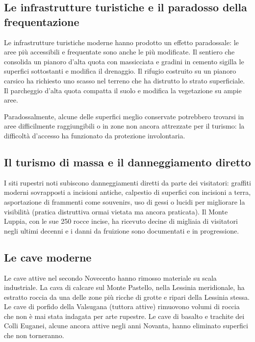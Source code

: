 \subsection{Le infrastrutture turistiche e il paradosso della frequentazione}

Le infrastrutture turistiche moderne hanno prodotto un effetto paradossale: le aree più accessibili e frequentate sono anche le più modificate. Il sentiero che consolida un pianoro d'alta quota con massicciata e gradini in cemento sigilla le superfici sottostanti e modifica il drenaggio. Il rifugio costruito su un pianoro carsico ha richiesto uno scasso nel terreno che ha distrutto lo strato superficiale. Il parcheggio d'alta quota compatta il suolo e modifica la vegetazione su ampie aree.

Paradossalmente, alcune delle superfici meglio conservate potrebbero trovarsi in aree difficilmente raggiungibili o in zone non ancora attrezzate per il turismo: la difficoltà d'accesso ha funzionato da protezione involontaria.

\subsection{Il turismo di massa e il danneggiamento diretto}

I siti rupestri noti subiscono danneggiamenti diretti da parte dei visitatori: graffiti moderni sovrapposti a incisioni antiche, calpestio di superfici con incisioni a terra, asportazione di frammenti come souvenirs, uso di gessi o lucidi per migliorare la visibilità (pratica distruttiva ormai vietata ma ancora praticata). Il Monte Luppia, con le sue 250 rocce incise, ha ricevuto decine di migliaia di visitatori negli ultimi decenni e i danni da fruizione sono documentati e in progressione.

\subsection{Le cave moderne}

Le cave attive nel secondo Novecento hanno rimosso materiale su scala industriale. La cava di calcare sul Monte Pastello, nella Lessinia meridionale, ha estratto roccia da una delle zone più ricche di grotte e ripari della Lessinia stessa. Le cave di porfido della Valsugana (tuttora attive) rimuovono volumi di roccia che non è mai stata indagata per arte rupestre. Le cave di basalto e trachite dei Colli Euganei, alcune ancora attive negli anni Novanta, hanno eliminato superfici che non torneranno.

